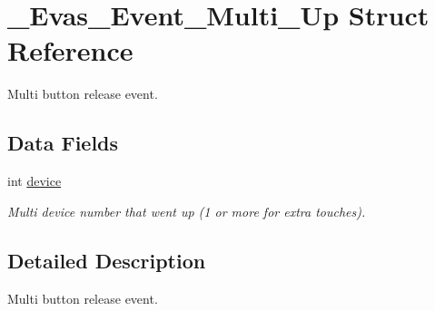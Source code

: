 \section{\_\-Evas\_\-Event\_\-Multi\_\-Up Struct Reference}
\label{struct__Evas__Event__Multi__Up}


Multi button release event.  


\subsection*{Data Fields}
\begin{DoxyCompactItemize}
\item 
int \hyperlink{struct__Evas__Event__Multi__Up_a6569e24edde1a26221efbdf54b62f5c9}{device}\label{struct__Evas__Event__Multi__Up_a6569e24edde1a26221efbdf54b62f5c9}

\begin{DoxyCompactList}\small\item\em Multi device number that went up (1 or more for extra touches). \item\end{DoxyCompactList}\end{DoxyCompactItemize}


\subsection{Detailed Description}
Multi button release event. 